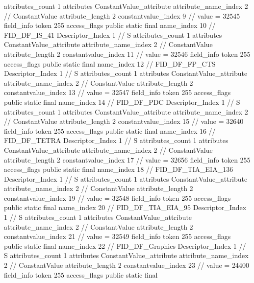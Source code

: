{{{{{				attributes_count	1
				attributes {
				ConstantValue_attribute {
					attribute_name_index	2		// ConstantValue
					attribute_length	2
					constantvalue_index	9		// value = 32545
				}
				}
			}
			field_info {
				token	255
				access_flags	public static final
				name_index	10		// FID_DF_IS_41
				Descriptor_Index	1		// S
				attributes_count	1
				attributes {
				ConstantValue_attribute {
					attribute_name_index	2		// ConstantValue
					attribute_length	2
					constantvalue_index	11		// value = 32546
				}
				}
			}
			field_info {
				token	255
				access_flags	public static final
				name_index	12		// FID_DF_FP_CTS
				Descriptor_Index	1		// S
				attributes_count	1
				attributes {
				ConstantValue_attribute {
					attribute_name_index	2		// ConstantValue
					attribute_length	2
					constantvalue_index	13		// value = 32547
				}
				}
			}
			field_info {
				token	255
				access_flags	public static final
				name_index	14		// FID_DF_PDC
				Descriptor_Index	1		// S
				attributes_count	1
				attributes {
				ConstantValue_attribute {
					attribute_name_index	2		// ConstantValue
					attribute_length	2
					constantvalue_index	15		// value = 32640
				}
				}
			}
			field_info {
				token	255
				access_flags	public static final
				name_index	16		// FID_DF_TETRA
				Descriptor_Index	1		// S
				attributes_count	1
				attributes {
				ConstantValue_attribute {
					attribute_name_index	2		// ConstantValue
					attribute_length	2
					constantvalue_index	17		// value = 32656
				}
				}
			}
			field_info {
				token	255
				access_flags	public static final
				name_index	18		// FID_DF_TIA_EIA_136
				Descriptor_Index	1		// S
				attributes_count	1
				attributes {
				ConstantValue_attribute {
					attribute_name_index	2		// ConstantValue
					attribute_length	2
					constantvalue_index	19		// value = 32548
				}
				}
			}
			field_info {
				token	255
				access_flags	public static final
				name_index	20		// FID_DF_TIA_EIA_95
				Descriptor_Index	1		// S
				attributes_count	1
				attributes {
				ConstantValue_attribute {
					attribute_name_index	2		// ConstantValue
					attribute_length	2
					constantvalue_index	21		// value = 32549
				}
				}
			}
			field_info {
				token	255
				access_flags	public static final
				name_index	22		// FID_DF_Graphics
				Descriptor_Index	1		// S
				attributes_count	1
				attributes {
				ConstantValue_attribute {
					attribute_name_index	2		// ConstantValue
					attribute_length	2
					constantvalue_index	23		// value = 24400
				}
				}
			}
			field_info {
				token	255
				access_flags	public static final
}}}}}
